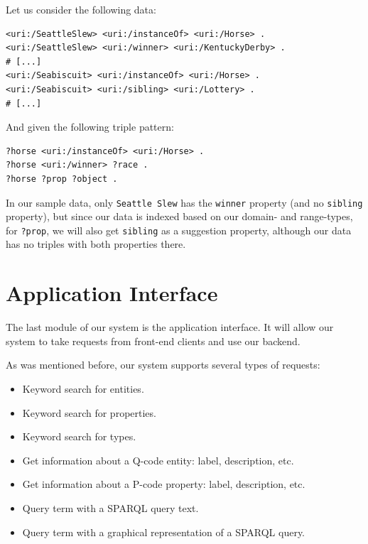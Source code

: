 \begin{example}
Let us consider the following data:

\begin{verbatim}
<uri:/SeattleSlew> <uri:/instanceOf> <uri:/Horse> .
<uri:/SeattleSlew> <uri:/winner> <uri:/KentuckyDerby> .
# [...]
<uri:/Seabiscuit> <uri:/instanceOf> <uri:/Horse> .
<uri:/Seabiscuit> <uri:/sibling> <uri:/Lottery> .
# [...]
\end{verbatim}

And given the following triple pattern:
\begin{verbatim}
?horse <uri:/instanceOf> <uri:/Horse> .
?horse <uri:/winner> ?race .
?horse ?prop ?object .
\end{verbatim}


In our sample data, only \texttt{Seattle Slew} has the \texttt{winner} property (and no \texttt{sibling} property), but since our data is indexed based on our domain- and range-types, for \texttt{?prop}, we will also get \texttt{sibling} as a suggestion property, although our data has no triples with both properties there.

\end{example}


\section{Application Interface}
\label{chap:api}

The last module of our system is the application interface. It will allow our system to take requests from front-end clients and use our backend.

As was mentioned before, our system supports several types of requests:
\begin{itemize}
    \item Keyword search for entities.
    \item Keyword search for properties.
    \item Keyword search for types.
    \item Get information about a Q-code entity: label, description, etc.
    \item Get information about a P-code property: label, description, etc.
    \item Query term with a SPARQL query text.
    \item Query term with a graphical representation of a SPARQL query.
\end{itemize}

